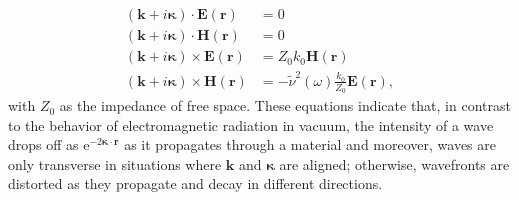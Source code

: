 \begin{subequations}
\begin{align} %
 \left( \mathbold{k} + i \mathbold{\kappa} \right) \cdot \mathbold{E} \left( \mathbold{r} \right) &= 0 \label{eq:Maxwell_med_FT_1} \\
 \left( \mathbold{k} + i \mathbold{\kappa} \right) \cdot \mathbold{H} \left( \mathbold{r} \right) &= 0 \label{eq:Maxwell_med_FT_2} \\
 \left( \mathbold{k} + i \mathbold{\kappa} \right) \times \mathbold{E} \left( \mathbold{r} \right) &= Z_0 k_0 \mathbold{H} \left( \mathbold{r} \right) \label{eq:Maxwell_med_FT_3} \\
 \left( \mathbold{k} + i \mathbold{\kappa} \right) \times \mathbold{H} \left( \mathbold{r} \right) &= - \tilde{\nu}^2 (\omega) \frac{k_0}{Z_0} \mathbold{E} \left( \mathbold{r} \right) \label{eq:Maxwell_med_FT_4} ,
 \end{align}
\end{subequations}
with $Z_0$ as the impedance of free space. 
These equations indicate that, in contrast to the behavior of electromagnetic radiation in vacuum, the intensity of a wave drops off as $\mathrm{e}^{-2 \mathbold{\kappa} \cdot \mathbold{r}}$ as it propagates through a material and moreover, waves are only transverse in situations where $\mathbold{k}$ and $\mathbold{\kappa}$ are aligned; otherwise, wavefronts are distorted as they propagate and decay in different directions. 

